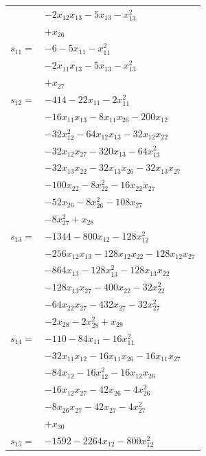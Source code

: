 \begin{longtable}{@{}r@{\;}l@{}}
 & \(\displaystyle -2x_{12}x_{13} -5x_{13} -x_{13}^{2}\) \\
 & \(\displaystyle +x_{26}\) \\[3pt]
\(s_{11}=\) & \(\displaystyle -6 -5x_{11} -x_{11}^{2}\) \\
 & \(\displaystyle -2x_{11}x_{13} -5x_{13} -x_{13}^{2}\) \\
 & \(\displaystyle +x_{27}\) \\[3pt]
\(s_{12}=\) & \(\displaystyle -414 -22x_{11} -2x_{11}^{2}\) \\
 & \(\displaystyle -16x_{11}x_{13} -8x_{11}x_{26} -200x_{12}\) \\
 & \(\displaystyle -32x_{12}^{2} -64x_{12}x_{13} -32x_{12}x_{22}\) \\
 & \(\displaystyle -32x_{12}x_{27} -320x_{13} -64x_{13}^{2}\) \\
 & \(\displaystyle -32x_{13}x_{22} -32x_{13}x_{26} -32x_{13}x_{27}\) \\
 & \(\displaystyle -100x_{22} -8x_{22}^{2} -16x_{22}x_{27}\) \\
 & \(\displaystyle -52x_{26} -8x_{26}^{2} -108x_{27}\) \\
 & \(\displaystyle -8x_{27}^{2} +x_{28}\) \\[3pt]
\(s_{13}=\) & \(\displaystyle -1344 -800x_{12} -128x_{12}^{2}\) \\
 & \(\displaystyle -256x_{12}x_{13} -128x_{12}x_{22} -128x_{12}x_{27}\) \\
 & \(\displaystyle -864x_{13} -128x_{13}^{2} -128x_{13}x_{22}\) \\
 & \(\displaystyle -128x_{13}x_{27} -400x_{22} -32x_{22}^{2}\) \\
 & \(\displaystyle -64x_{22}x_{27} -432x_{27} -32x_{27}^{2}\) \\
 & \(\displaystyle -2x_{28} -2x_{28}^{2} +x_{29}\) \\[3pt]
\(s_{14}=\) & \(\displaystyle -110 -84x_{11} -16x_{11}^{2}\) \\
 & \(\displaystyle -32x_{11}x_{12} -16x_{11}x_{26} -16x_{11}x_{27}\) \\
 & \(\displaystyle -84x_{12} -16x_{12}^{2} -16x_{12}x_{26}\) \\
 & \(\displaystyle -16x_{12}x_{27} -42x_{26} -4x_{26}^{2}\) \\
 & \(\displaystyle -8x_{26}x_{27} -42x_{27} -4x_{27}^{2}\) \\
 & \(\displaystyle +x_{30}\) \\[3pt]
\(s_{15}=\) & \(\displaystyle -1592 -2264x_{12} -800x_{12}^{2}\) \\

\end{longtable}
